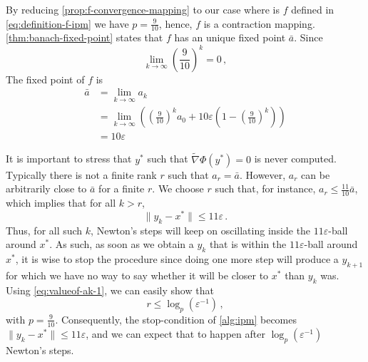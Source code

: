 By reducing \autoref{prop:f-convergence-mapping} to our case where is $f$
defined in \autoref{eq:definition-f-ipm} we have $p = \frac{9}{10}$, hence, $f$
is a contraction mapping. \autoref{thm:banach-fixed-point} states that $f$ has
an unique fixed point $\bar a$. Since
\begin{equation*}
    \lim_{k \rightarrow \infty} (\frac{9}{10})^{k} = 0 \, ,
\end{equation*}
The fixed point of $f$ is
\begin{equation*}
    \begin{aligned}
        \bar a
            & = \lim_{k \rightarrow \infty} a_{k} \\
            & = \lim_{k \rightarrow \infty} \left( (\frac{9}{10})^{k} a_0 + 10 \varepsilon \left(1 - (\frac{9}{10})^{k}\right) \right) \\
            & = 10\varepsilon
    \end{aligned}
\end{equation*}

It is important to stress that $y^*$ such that $\tilde \nabla \Phi(y^*) = 0$ is
never computed. Typically there is not a finite rank $r$ such that $a_r = \bar
a$. However, $a_r$ can be arbitrarily close to $\bar a$ for a finite $r$. We
choose $r$ such that, for instance, $a_r \leq \frac{11}{10} \bar a$, which
implies that for all $k > r$,
\begin{equation*}
    \|y_k - x^*\| \leq 11\varepsilon \, .
\end{equation*}
Thus, for all such $k$, Newton's steps will keep on oscillating inside the
$11\varepsilon$-ball around $x^*$. As such, as soon as we obtain a $y_k$ that is
within the $11\varepsilon$-ball around $x^*$, it is wise to stop the procedure
since doing one more step will produce a $y_{k+1}$ for which we have no way to
say whether it will be closer to $x^*$ than $y_k$ was. Using
\autoref{eq:valueof-ak-1}, we can easily show that
\begin{equation*}
    r \leq \log_p(\varepsilon^{-1}) \, ,
\end{equation*}
with $p = \frac{9}{10}$. Consequently, the stop-condition of \autoref{alg:ipm}
becomes $\|y_k - x^*\| \leq 11 \varepsilon$, and we can expect that to happen
after $\log_p(\varepsilon^{-1})$ Newton's steps.